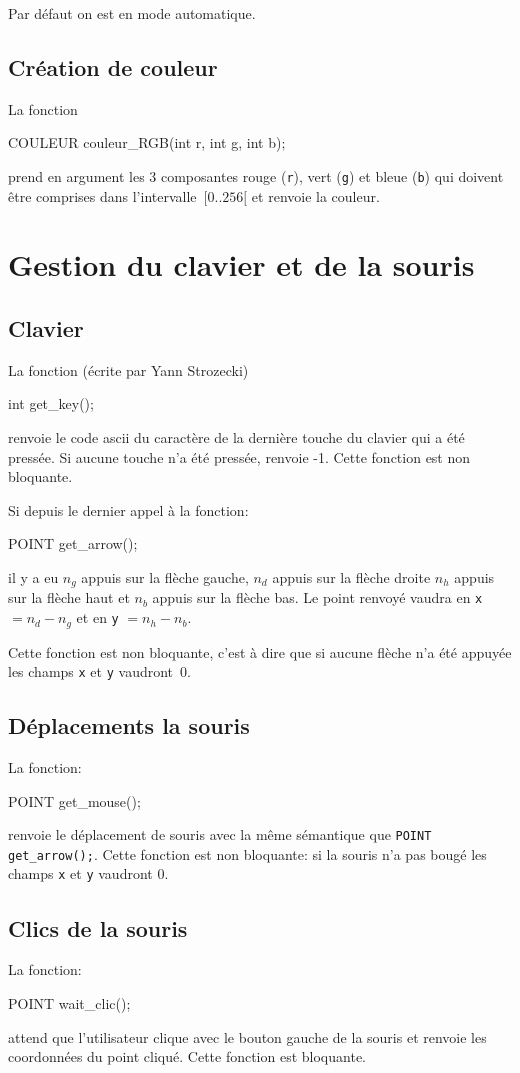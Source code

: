 \documentclass{report}
\newcommand\code[1]{
\begin{mdframed}[linecolor=purple,backgroundcolor=blue!10]
{\tt
#1
}
\end{mdframed}
}
\begin{document}
Par défaut on est en mode automatique.

\subsection{Création de couleur\label{sec:coul}}
La fonction
\code{
COULEUR couleur\_RGB(int r, int g, int b);
}
prend en argument les 3 composantes rouge (\texttt{r}), vert (\texttt{g})
et bleue (\texttt{b}) qui doivent être comprises
dans l'intervalle~$[0..256[$ et renvoie la couleur.


\section{Gestion du clavier et de la souris}
\subsection{Clavier}
La fonction (écrite par Yann Strozecki)
\code{
int get\_key();
}
renvoie le code ascii du caractère de la dernière touche du clavier qui a été pressée.
Si aucune touche n'a été pressée, renvoie -1.
Cette fonction est non bloquante.

Si depuis le dernier appel à la fonction:
\code{
POINT get\_arrow();
}
il y a eu $n_g$ appuis sur la flèche gauche, $n_d$ appuis sur la flèche droite
$n_h$ appuis sur la flèche haut et $n_b$ appuis sur la flèche bas.
Le point renvoyé vaudra en \texttt{x} $=n_d-n_g$ et en \texttt{y} $=n_h-n_b$.

Cette fonction est non bloquante, c'est à dire que si aucune flèche n'a été
appuyée les champs \texttt{x} et \texttt{y} vaudront~0.

\subsection{Déplacements la souris}
La fonction:
\code{
POINT get\_mouse();
}
renvoie le déplacement de souris avec la même sémantique que 
\texttt{POINT get\_arrow();}. Cette fonction est non bloquante:
si la souris n'a pas bougé les champs \texttt{x} et \texttt{y} vaudront 0.

\subsection{Clics de la souris}
La fonction:
\code{
POINT wait\_clic();
}
attend que l'utilisateur clique avec le bouton gauche de la souris
et renvoie les coordonnées du point cliqué. Cette fonction est bloquante.
\end{document}
